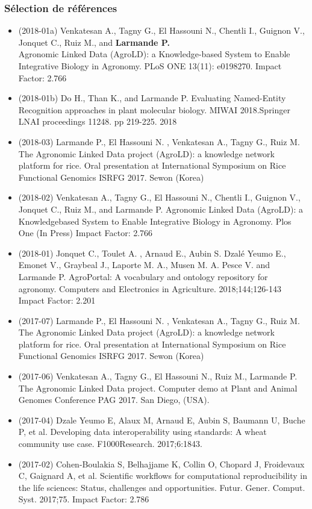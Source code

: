 \subsubsection*{Sélection de références} 
\begin{itemize}
\item  (2018-01a) Venkatesan A., Tagny G., El Hassouni N., Chentli I., Guignon V., Jonquet C., Ruiz M., and \textbf{Larmande P.}\\ Agronomic Linked Data (AgroLD): a Knowledge-based System to Enable Integrative Biology in Agronomy. PLoS ONE 13(11): e0198270.  Impact Factor: 2.766
\item (2018-01b) Do H., Than K., and Larmande P. Evaluating Named-Entity Recognition approaches in plant molecular biology. MIWAI 2018.Springer LNAI proceedings 11248. pp 219-225. 2018
\item (2018-03) Larmande P., El Hassouni N. , Venkatesan A., Tagny G., Ruiz M. The Agronomic Linked Data project (AgroLD): a knowledge network platform for rice. Oral presentation at International Symposium on Rice Functional Genomics ISRFG 2017. Sewon (Korea)
\item  (2018-02) Venkatesan A., Tagny G., El Hassouni N., Chentli I., Guignon V., Jonquet C., Ruiz M., and Larmande P. Agronomic Linked Data (AgroLD): a Knowledge\-based System to Enable Integrative Biology in Agronomy. Plos One (In Press) Impact Factor: 2.766
\item (2018-01) Jonquet C.,  Toulet A. , Arnaud E.,  Aubin S. {Dzal{\'{e}} Yeumo} E., Emonet V., Graybeal J., Laporte M. A., Musen M. A. Pesce V. and Larmande P. AgroPortal: A vocabulary and ontology repository for agronomy. Computers and Electronics in Agriculture. 2018;144;126-143 Impact Factor: 2.201
\item (2017-07) Larmande P., El Hassouni N. , Venkatesan A., Tagny G., Ruiz M. The Agronomic Linked Data project (AgroLD): a knowledge network platform for rice. Oral presentation at International Symposium on Rice Functional Genomics ISRFG 2017. Sewon (Korea)
\item (2017-06) Venkatesan A., Tagny G., El Hassouni N., Ruiz M., Larmande P. The Agronomic Linked Data project. Computer demo at Plant and Animal Genomes Conference PAG 2017. San Diego, (USA).
\item (2017-04) Dzale Yeumo E, Alaux M, Arnaud E, Aubin S, Baumann U, Buche P, et al. Developing data interoperability using standards: A wheat community use case. F1000Research. 2017;6:1843.
\item (2017-02) Cohen-Boulakia S, Belhajjame K, Collin O, Chopard J, Froidevaux C, Gaignard A, et al. Scientific workflows for computational reproducibility in the life sciences: Status, challenges and opportunities. Futur. Gener. Comput. Syst. 2017;75. Impact Factor: 2.786

\end{itemize}
